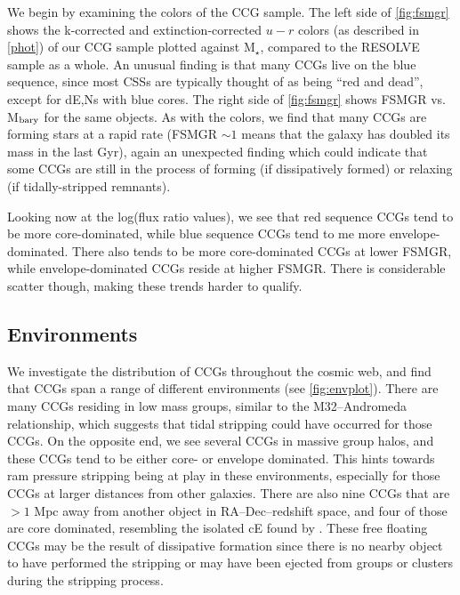 \documentclass[iop,apj]{emulateapj}
\begin{document}
\noindent We begin by examining the colors of the CCG sample. The left side of \autoref{fig:fsmgr} shows the k-corrected and extinction-corrected $u-r$ colors (as described in \autoref{phot}) of our CCG sample plotted against M$_{\star}$, compared to the RESOLVE sample as a whole. An unusual finding is that many CCGs live on the blue sequence, since most CSSs are typically thought of as being ``red and dead'', except for dE,Ns with blue cores. The right side of \autoref{fig:fsmgr} shows FSMGR vs. M$_{\rm bary}$ for the same objects. As with the colors, we find that many CCGs are forming stars at a rapid rate (FSMGR $\sim1$ means that the galaxy has doubled its mass in the last Gyr), again an unexpected finding which could indicate that some CCGs are still in the process of forming (if dissipatively formed) or relaxing (if tidally-stripped remnants).

Looking now at the log(flux ratio values), we see that red sequence CCGs tend to be more core-dominated, while blue sequence CCGs tend to me more envelope-dominated. There also tends to be more core-dominated CCGs at lower FSMGR, while envelope-dominated CCGs reside at higher FSMGR. There is considerable scatter though, making these trends harder to qualify.


\subsection{Environments}
\noindent We investigate the distribution of CCGs throughout the cosmic web, and find that CCGs span a range of different environments (see \autoref{fig:envplot}). There are many CCGs residing in low mass groups, similar to the M32--Andromeda relationship, which suggests that tidal stripping could have occurred for those CCGs. On the opposite end, we see several CCGs in massive group halos, and these CCGs tend to be either core- or envelope dominated. This hints towards ram pressure stripping being at play in these environments, especially for those CCGs at larger distances from other galaxies. There are also nine CCGs that are $>1$ Mpc away from another object in RA--Dec--redshift space, and four of those are core dominated, resembling the isolated cE found by \citet{Huxor2013}. These free floating CCGs may be the result of dissipative formation since there is no nearby object to have performed the stripping or may have been ejected from groups or clusters during the stripping process.
 
\end{document}
